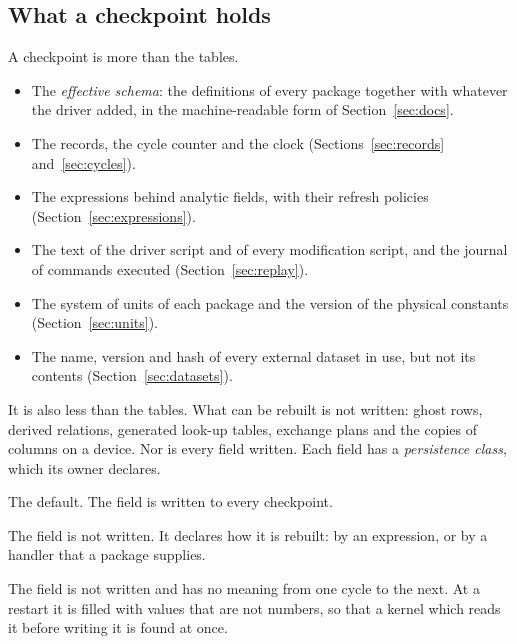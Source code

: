 \documentclass[11pt,a4paper]{article}
\begin{document}
\subsection{What a checkpoint holds}
\label{sec:checkpoint-holds}

A checkpoint is more than the tables.

\begin{itemize}
  \item The \emph{effective schema}: the definitions of every package
        together with whatever the driver added, in the machine-readable
        form of Section~\ref{sec:docs}.
  \item The records, the cycle counter and the clock
        (Sections~\ref{sec:records} and~\ref{sec:cycles}).
  \item The expressions behind analytic fields, with their refresh policies
        (Section~\ref{sec:expressions}).
  \item The text of the driver script and of every modification script, and
        the journal of commands executed (Section~\ref{sec:replay}).
  \item The system of units of each package and the version of the
        physical constants (Section~\ref{sec:units}).
  \item The name, version and hash of every external dataset in use, but
        not its contents (Section~\ref{sec:datasets}).
\end{itemize}

It is also less than the tables.  What can be rebuilt is not written: ghost
rows, derived relations, generated look-up tables, exchange plans and the
copies of columns on a device.  Nor is every field written.  Each field has
a \emph{persistence class}, which its owner declares.

\begin{description}[style=nextline,leftmargin=2em]
  \item[State.]
        The default.  The field is written to every checkpoint.
  \item[Derived.]
        The field is not written.  It declares how it is rebuilt: by an
        expression, or by a handler that a package supplies.
  \item[Scratch.]
        The field is not written and has no meaning from one cycle to the
        next.  At a restart it is filled with values that are not numbers,
        so that a kernel which reads it before writing it is found at once.
\end{description}
\end{document}

